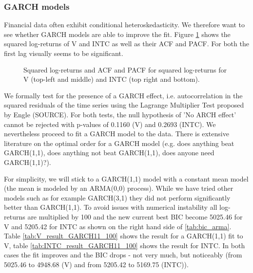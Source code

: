 \subsubsection{GARCH models}
Financial data often exhibit conditional heteroskedasticity. We therefore want to see whether GARCH models are able to improve the fit. Figure \ref{fig:V_INTC_squared} shows the squared log-returns of V and INTC as well as their ACF and PACF. For both the first lag visually seems to be significant. 

\begin{figure}[h]
    \centering
    \begin{adjustbox}{width=.95\textwidth,center}
    
    
    \end{adjustbox}
    \hspace{3ex}
    \begin{adjustbox}{width=.95\textwidth,center}
    
    \end{adjustbox}
    \begin{adjustbox}{width=.95\textwidth,center}
    
    \end{adjustbox}
    \caption{Squared log-returns and ACF and PACF for squared log-returns for V (top-left and middle) and INTC (top right and bottom). }
    \label{fig:V_INTC_squared}
\end{figure}{}

We formally test for the presence of a GARCH effect, i.e. autocorrelation in the squared residuals of the time series using the Lagrange Multiplier Test proposed by Engle (SOURCE). For both tests, the null hypothesis of 'No ARCH effect' cannot be rejected with p-values of 0.1160 (V) and 0.2693 (INTC). We nevertheless proceed to fit a GARCH model to the data. There is extensive literature on the optimal order for a GARCH model (e.g. does anything beat GARCH(1,1), does anything not beat GARCH(1,1), does anyone need GARCH(1,1)?). 

For simplicity, we will stick to a GARCH(1,1) model with a constant mean model (the mean is modeled by an ARMA(0,0) process). While we have tried other models such as for example GARCH(3,1) they did not perform significantly better than GARCH(1,1). To avoid issues with numerical instability all log-returns are multiplied by 100 and the new current best BIC become 5025.46 for V and 5205.42 for INTC as shown on the right hand side of \ref{tab:bic_arma}. Table \ref{tab:V_result_GARCH11_100} shows the result for a GARCH(1,1) fit to V, table \ref{tab:INTC_result_GARCH11_100} shows the result for INTC. In both cases the fit improves and the BIC drops - not very much, but noticeably (from 5025.46 to 4948.68 (V) and from 5205.42 to 5169.75 (INTC)). 

